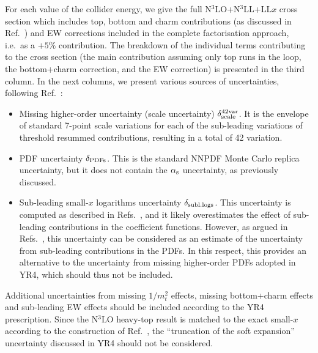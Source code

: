 For each value of the collider energy, we give the full
N$^3$LO+N$^3$LL+LL$x$ cross section which includes top, bottom and
charm contributions (as discussed in Ref.~\cite{Bonvini:2018iwt}) and
EW corrections included in the complete factorisation approach, i.e.\
as a $+5\%$ contribution.  The breakdown of the individual terms
contributing to the cross section (the main contribution assuming only
top runs in the loop, the bottom+charm correction, and the EW
correction) is presented in the third column.  In the next columns, we
present various sources of uncertainties,
following Ref.~\cite{Bonvini:2018ixe}:
\begin{itemize}
\item Missing higher-order uncertainty (scale uncertainty)
  $\delta_{\rm scale}^{\rm 42var}$. It is the envelope of standard
  7-point scale variations for each of the sub-leading variations of
  threshold resummed contributions, resulting in a total of 42
  variation.

\item PDF uncertainty $\delta_{\rm PDFs}$. This is the standard NNPDF
  Monte Carlo replica uncertainty, but it does not contain the $\alpha_\text{s}$
  uncertainty, as previously discussed.

\item Sub-leading small-$x$ logarithms uncertainty
  $\delta_{\rm subl.logs}$. This uncertainty is computed as described
  in Refs.~\cite{Bonvini:2018ixe,Bonvini:2018iwt}, and it likely
  overestimates the effect of sub-leading contributions in the
  coefficient functions. However, as argued in
  Refs.~\cite{Bonvini:2018ixe,Bonvini:2018iwt}, this uncertainty can
  be considered as an estimate of the uncertainty from sub-leading
  contributions in the PDFs. In this respect, this provides an
  alternative to the uncertainty from missing higher-order PDFs
  adopted in YR4, which should thus not be included.
\end{itemize}
Additional uncertainties from missing $1/m_t^2$ effects, missing
bottom+charm effects and sub-leading EW effects should be included
according to the YR4 prescription.  Since the N$^3$LO heavy-top result
is matched to the exact small-$x$ according to the construction of
Ref.~\cite{Bonvini:2018iwt}, the ``truncation of the soft expansion''
uncertainty discussed in YR4 should not be considered.

